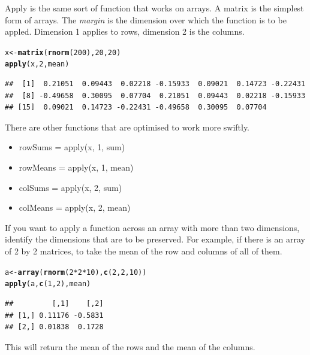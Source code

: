 \documentclass{article}\usepackage{graphicx, color}
\makeatletter
\newcommand{\hlfunctioncall}[1]{\textcolor[rgb]{0.501960784313725,0,0.329411764705882}{\textbf{#1}}}%
\newenvironment{kframe}{%
 \def\at@end@of@kframe{}%
 \ifinner\ifhmode%
  \def\at@end@of@kframe{\end{minipage}}%
  \begin{minipage}{\columnwidth}%
 \fi\fi%
 \def\FrameCommand##1{\hskip\@totalleftmargin \hskip-\fboxsep
 \colorbox{shadecolor}{##1}\hskip-\fboxsep
     \hskip-\linewidth \hskip-\@totalleftmargin \hskip\columnwidth}%
 \MakeFramed {\advance\hsize-\width
   \@totalleftmargin\z@ \linewidth\hsize
   \@setminipage}}%
 {\par\unskip\endMakeFramed%
 \at@end@of@kframe}
\newenvironment{knitrout}{}{} %
\makeatother
\begin{document}
Apply is the same sort of function that works on arrays.  A matrix is the simplest form of arrays. The \emph{margin} is the dimension over which the function is to be appled.  Dimension 1 applies to rows, dimension 2 is the columns.  
\begin{knitrout}
\color{fgcolor}\begin{kframe}
\begin{alltt}
x <- \hlfunctioncall{matrix}(\hlfunctioncall{rnorm}(200), 20, 20)
\hlfunctioncall{apply}(x, 2, mean)
\end{alltt}
\begin{verbatim}
##  [1]  0.21051  0.09443  0.02218 -0.15933  0.09021  0.14723 -0.22431
##  [8] -0.49658  0.30095  0.07704  0.21051  0.09443  0.02218 -0.15933
## [15]  0.09021  0.14723 -0.22431 -0.49658  0.30095  0.07704
\end{verbatim}
\end{kframe}
\end{knitrout}

There are other functions that are optimised to work more swiftly. 
\begin{itemize}
\item rowSums = apply(x, 1, sum)
\item rowMeans = apply(x, 1, mean)
\item colSums = apply(x, 2, sum)
\item colMeans = apply(x, 2, mean)
\end{itemize}
If you want to apply a function across an array with more than two dimensions, identify the dimensions that are to be preserved.  For example, if there is an array of 2 by 2 matrices, to take the mean of the row and columns of all of them.
\begin{knitrout}
\color{fgcolor}\begin{kframe}
\begin{alltt}
a <- \hlfunctioncall{array}(\hlfunctioncall{rnorm}(2 * 2 * 10), \hlfunctioncall{c}(2, 2, 10))
\hlfunctioncall{apply}(a, \hlfunctioncall{c}(1, 2), mean)
\end{alltt}
\begin{verbatim}
##         [,1]    [,2]
## [1,] 0.11176 -0.5831
## [2,] 0.01838  0.1728
\end{verbatim}
\end{kframe}
\end{knitrout}

This will return the mean of the rows and the mean of the columns.  
\end{document}

